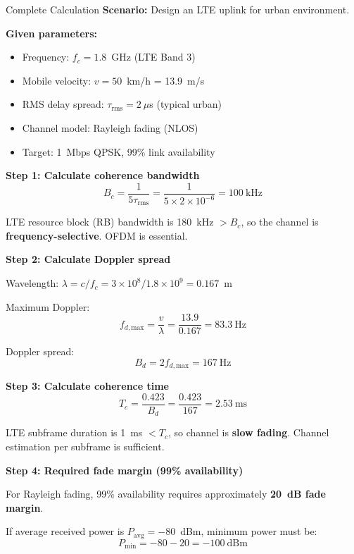 \begin{calloutbox}{Complete Calculation}
\textbf{Scenario:} Design an LTE uplink for urban environment.

\textbf{Given parameters:}
\begin{itemize}
\item Frequency: $f_c = 1.8$~GHz (LTE Band 3)
\item Mobile velocity: $v = 50$~km/h = 13.9~m/s
\item RMS delay spread: $\tau_{\text{rms}} = 2~\mu$s (typical urban)
\item Channel model: Rayleigh fading (NLOS)
\item Target: 1~Mbps QPSK, 99\% link availability
\end{itemize}

\textbf{Step 1: Calculate coherence bandwidth}
\begin{equation}
B_c = \frac{1}{5\tau_{\text{rms}}} = \frac{1}{5 \times 2 \times 10^{-6}} = 100~\text{kHz}
\end{equation}

LTE resource block (RB) bandwidth is 180~kHz $> B_c$, so the channel is \textbf{frequency-selective}. OFDM is essential.

\textbf{Step 2: Calculate Doppler spread}

Wavelength: $\lambda = c/f_c = 3 \times 10^8 / 1.8 \times 10^9 = 0.167$~m

Maximum Doppler:
\begin{equation}
f_{d,\text{max}} = \frac{v}{\lambda} = \frac{13.9}{0.167} = 83.3~\text{Hz}
\end{equation}

Doppler spread:
\begin{equation}
B_d = 2 f_{d,\text{max}} = 167~\text{Hz}
\end{equation}

\textbf{Step 3: Calculate coherence time}
\begin{equation}
T_c = \frac{0.423}{B_d} = \frac{0.423}{167} = 2.53~\text{ms}
\end{equation}

LTE subframe duration is 1~ms $< T_c$, so channel is \textbf{slow fading}. Channel estimation per subframe is sufficient.

\textbf{Step 4: Required fade margin (99\% availability)}

For Rayleigh fading, 99\% availability requires approximately \textbf{20~dB fade margin}.

If average received power is $P_{\text{avg}} = -80$~dBm, minimum power must be:
\begin{equation}
P_{\text{min}} = -80 - 20 = -100~\text{dBm}
\end{equation}


\end{calloutbox}
